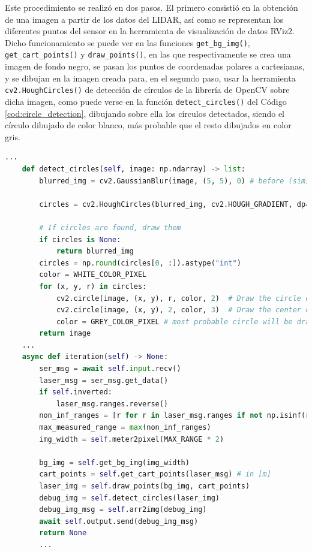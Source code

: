 Este procedimiento se realizó en dos pasos.
El primero consistió en la obtención de una imagen a partir de los datos del
LIDAR, así como se representan los diferentes puntos del sensor en la
herramienta de visualización de datos RViz2.
Dicho funcionamiento se puede ver en las funciones \verb|get_bg_img()|,
\verb|get_cart_points()| y \verb|draw_points()|, en las que respectivamente se
crea una imagen de fondo negro, se pasan los puntos de coordenadas polares a
cartesianas, y se dibujan en la imagen creada para, en el segundo paso, usar la
herramienta \verb|cv2.HoughCircles()| de detección de círculos de la librería de
OpenCV sobre dicha imagen, como puede verse en la función
\verb|detect_circles()| del Código \ref{cod:circle_detection}, dibujando sobre
ella los círculos detectados, siendo el círculo dibujado de color blanco, más
probable que el resto dibujados en color gris.
\\

\begin{code}[h!]
  \begin{lstlisting}[language=Python]
    ...
    def detect_circles(self, image: np.ndarray) -> list:
        blurred_img = cv2.GaussianBlur(image, (5, 5), 0) # before (sim) :image, (5, 5), 2

        circles = cv2.HoughCircles(blurred_img, cv2.HOUGH_GRADIENT, dp=1, minDist=40, param1=30, param2=25, minRadius=10, maxRadius=100)

        # If circles are found, draw them
        if circles is None:
            return blurred_img
        circles = np.round(circles[0, :]).astype("int")
        color = WHITE_COLOR_PIXEL
        for (x, y, r) in circles:
            cv2.circle(image, (x, y), r, color, 2)  # Draw the circle outline
            cv2.circle(image, (x, y), 2, color, 3)  # Draw the center of the circle
            color = GREY_COLOR_PIXEL # most probable circle will be drawn in white
        return image
    ...
    async def iteration(self) -> None:
        ser_msg = await self.input.recv()
        laser_msg = ser_msg.get_data()
        if self.inverted:
            laser_msg.ranges.reverse()
        non_inf_ranges = [r for r in laser_msg.ranges if not np.isinf(r)]
        max_measured_range = max(non_inf_ranges)
        img_width = self.meter2pixel(MAX_RANGE * 2)

        bg_img = self.get_bg_img(img_width)
        cart_points = self.get_cart_points(laser_msg) # in [m]
        laser_img = self.draw_points(bg_img, cart_points)
        debug_img = self.detect_circles(laser_img)
        debug_img_msg = self.arr2img(debug_img)
        await self.output.send(debug_img_msg)
        return None
        ...
  \end{lstlisting}
\caption[Funciones de detección de círculos de un nodo de Zenoh-Flow]{Funciones de detección de círculos de un nodo de Zenoh-Flow}
\label{cod:circle_detection}
\end{code}


